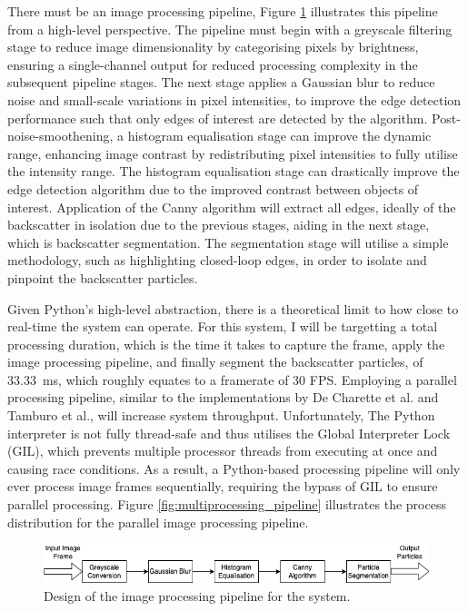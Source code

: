 There must be an image processing pipeline, Figure \ref{fig:processing_pipeline} illustrates this pipeline from a high-level perspective. The pipeline must begin with a greyscale filtering stage to reduce image dimensionality by categorising pixels by brightness, ensuring a single-channel output for reduced processing complexity in the subsequent pipeline stages. The next stage applies a Gaussian blur to reduce noise and small-scale variations in pixel intensities, to improve the edge detection performance such that only edges of interest are detected by the algorithm. Post-noise-smoothening, a histogram equalisation stage can improve the dynamic range, enhancing image contrast by redistributing pixel intensities to fully utilise the intensity range. The histogram equalisation stage can drastically improve the edge detection algorithm due to the improved contrast between objects of interest. Application of the Canny algorithm will extract all edges, ideally of the backscatter in isolation due to the previous stages, aiding in the next stage, which is backscatter segmentation. The segmentation stage will utilise a simple methodology, such as highlighting closed-loop edges, in order to isolate and pinpoint the backscatter particles.

Given Python's high-level abstraction, there is a theoretical limit to how close to real-time the system can operate. For this system, I will be targetting a total processing duration, which is the time it takes to capture the frame, apply the image processing pipeline, and finally segment the backscatter particles, of \SI{33.33}{\milli\second}, which roughly equates to a framerate of 30 FPS. Employing a parallel processing pipeline, similar to the implementations by De Charette et al. and Tamburo et al., will increase system throughput. Unfortunately, The Python interpreter is not fully thread-safe and thus utilises the Global Interpreter Lock (GIL), which prevents multiple processor threads from executing at once and causing race conditions. As a result, a Python-based processing pipeline will only ever process image frames sequentially, requiring the bypass of GIL to ensure parallel processing. Figure \ref{fig:multiprocessing_pipeline} illustrates the process distribution for the parallel image processing pipeline.

\begin{figure}[H]
    \centering
    \includegraphics[width=1\textwidth]{assets/image-processing-pipeline.png}
    \caption{Design of the image processing pipeline for the system.}
    \label{fig:processing_pipeline}
\end{figure}

